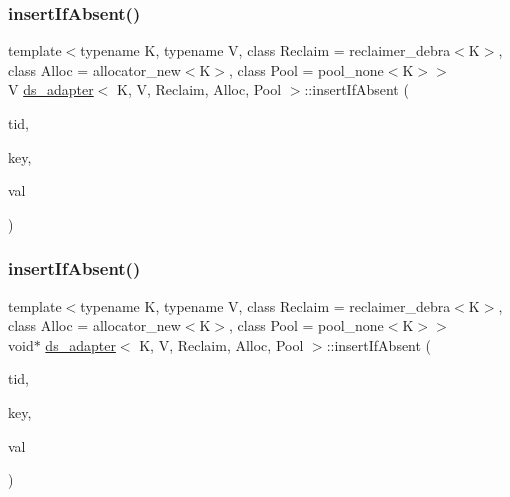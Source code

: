 \subsubsection{\texorpdfstring{insert\+If\+Absent()}{insertIfAbsent()}\hspace{0.1cm}{\footnotesize\ttfamily [12/26]}}
{\footnotesize\ttfamily template$<$typename K, typename V, class Reclaim = reclaimer\+\_\+debra$<$\+K$>$, class Alloc = allocator\+\_\+new$<$\+K$>$, class Pool = pool\+\_\+none$<$\+K$>$$>$ \\
V \hyperlink{classds__adapter}{ds\+\_\+adapter}$<$ K, V, Reclaim, Alloc, Pool $>$\+::insert\+If\+Absent (\begin{DoxyParamCaption}\item[{const int}]{tid,  }\item[{const K \&}]{key,  }\item[{const V \&}]{val }\end{DoxyParamCaption})\hspace{0.3cm}{\ttfamily [inline]}}

\mbox{\label{classds__adapter_a336af5f3838dbc78bb04f2a69f5b98fb}} 
\subsubsection{\texorpdfstring{insert\+If\+Absent()}{insertIfAbsent()}\hspace{0.1cm}{\footnotesize\ttfamily [13/26]}}
{\footnotesize\ttfamily template$<$typename K, typename V, class Reclaim = reclaimer\+\_\+debra$<$\+K$>$, class Alloc = allocator\+\_\+new$<$\+K$>$, class Pool = pool\+\_\+none$<$\+K$>$$>$ \\
void$\ast$ \hyperlink{classds__adapter}{ds\+\_\+adapter}$<$ K, V, Reclaim, Alloc, Pool $>$\+::insert\+If\+Absent (\begin{DoxyParamCaption}\item[{const int}]{tid,  }\item[{const K \&}]{key,  }\item[{const V \&}]{val }\end{DoxyParamCaption})\hspace{0.3cm}{\ttfamily [inline]}}

\mbox{\label{classds__adapter_ae9cb29ad0c0338c0e1d12ef97e008135}} 
